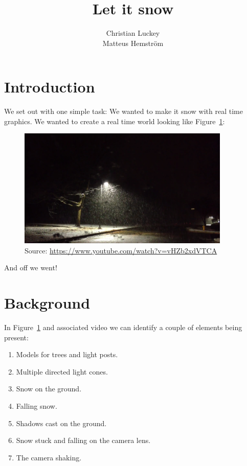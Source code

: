 \documentclass[a4paper,12pt]{article}
\title{Let it snow}
\author{Christian Luckey \\ Matteus Hemström}
\begin{document}
\maketitle

\newpage



\section{Introduction}

We set out with one simple task: We wanted to make it snow with real time graphics. We wanted to create a real time world looking like Figure~\ref{fig:youtube}:

\begin{figure}[ht]
  \centering
  \includegraphics[width=0.9\textwidth]{youtube}
  \caption{\label{fig:youtube} Source: \href{https://www.youtube.com/watch?v=vHZb2xdVTCA}{https://www.youtube.com/watch?v=vHZb2xdVTCA}}
\end{figure}
\noindent
And off we went!



\section{Background}

In Figure~\ref{fig:youtube} and associated video we can identify a couple of elements being present:

\begin{enumerate}
  \item Models for trees and light posts.
  \item Multiple directed light cones.
  \item Snow on the ground.
  \item Falling snow.
  \item Shadows cast on the ground.
  \item Snow stuck and falling on the camera lens.
  \item The camera shaking.
\end{enumerate}
\end{document}
